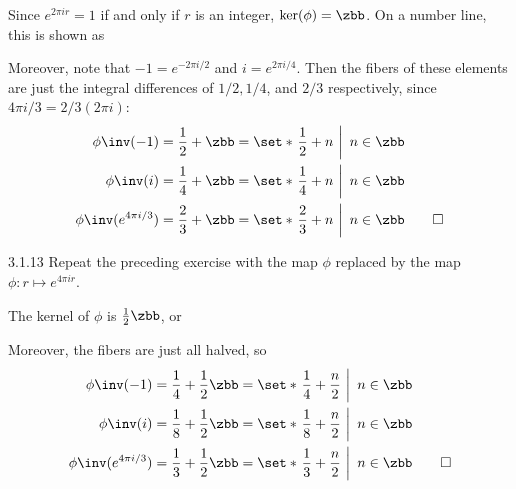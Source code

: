 \begin{sol}
    Since $e^{2\pi ir} = 1$ if and only if $r$ is an integer, $\ker(\phi) = \zbb$.
	On a number line, this is shown as
    \begin{center}
    \end{center}
    Moreover, note that $-1 = e^{-2\pi i/2}$ and $i = e^{2\pi i/4}$.
	Then the fibers of these elements are just the integral differences of $1/2, 1/4$, and $2/3$ respectively, since $4\pi i/3 = 2/3(2\pi i)$:
    \begin{align*}
        \phi\inv(-1) & = \frac 12 + \zbb = \set*{\left.\frac 12 + n~\right|~n \in \zbb} \\
        \phi\inv(i) & = \frac 14 + \zbb = \set*{\left.\frac 14 + n~\right|~n \in \zbb} \\
        \phi\inv(e^{4\pi i/3}) & = \frac 23 + \zbb = \set*{\left.\frac 23 + n~\right|~n \in \zbb} \qedhere
    \end{align*}
\end{sol}

\begin{exercise}{3.1.13}
    Repeat the preceding exercise with the map $\phi$ replaced by the map $\phi : r \mapsto e^{4\pi i r}$.
\end{exercise}

\begin{sol}
    The kernel of $\phi$ is $\frac12\zbb$, or
    \begin{center}
    \end{center}
    Moreover, the fibers are just all halved, so
    \begin{align*}
        \phi\inv(-1) & = \frac14 + \frac12 \zbb = \set*{\left.\frac14 + \frac n2~\right|~n \in \zbb} \\
        \phi\inv(i) & = \frac18 + \frac12 \zbb = \set*{\left.\frac18 + \frac n2~\right|~n \in \zbb} \\
        \phi\inv(e^{4\pi i/3}) & = \frac13 + \frac12 \zbb = \set*{\left.\frac13 + \frac n2~\right|~n \in \zbb} \qedhere
    \end{align*}
\end{sol}

